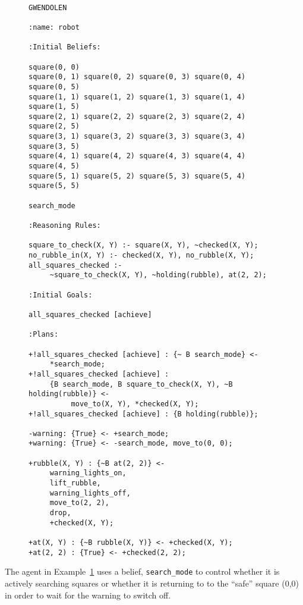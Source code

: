\begin{figure}[!htbp]
\begin{ourexample}
\label{code:pickuprubble_nolock} \quad \\
\begin{lstlisting}[basicstyle=\sffamily,style=easslisting,language=Gwendolen]
GWENDOLEN

:name: robot

:Initial Beliefs:

square(0, 0) 
square(0, 1) square(0, 2) square(0, 3) square(0, 4) square(0, 5)
square(1, 1) square(1, 2) square(1, 3) square(1, 4) square(1, 5)
square(2, 1) square(2, 2) square(2, 3) square(2, 4) square(2, 5)
square(3, 1) square(3, 2) square(3, 3) square(3, 4) square(3, 5)
square(4, 1) square(4, 2) square(4, 3) square(4, 4) square(4, 5)
square(5, 1) square(5, 2) square(5, 3) square(5, 4) square(5, 5)

search_mode

:Reasoning Rules:

square_to_check(X, Y) :- square(X, Y), ~checked(X, Y);
no_rubble_in(X, Y) :- checked(X, Y), no_rubble(X, Y);
all_squares_checked :- 
     ~square_to_check(X, Y), ~holding(rubble), at(2, 2);

:Initial Goals:

all_squares_checked [achieve]

:Plans:

+!all_squares_checked [achieve] : {~ B search_mode} <- 
     *search_mode;
+!all_squares_checked [achieve] : 
     {B search_mode, B square_to_check(X, Y), ~B holding(rubble)} <- 
          move_to(X, Y), *checked(X, Y);
+!all_squares_checked [achieve] : {B holding(rubble)};

-warning: {True} <- +search_mode;
+warning: {True} <- -search_mode, move_to(0, 0);

+rubble(X, Y) : {~B at(2, 2)} <- 
     warning_lights_on, 
     lift_rubble, 
     warning_lights_off, 
     move_to(2, 2), 
     drop, 
     +checked(X, Y);

+at(X, Y) : {~B rubble(X, Y)} <- +checked(X, Y);
+at(2, 2) : {True} <- +checked(2, 2);
\end{lstlisting}
\end{ourexample}
\end{figure}
The agent in Example~\ref{code:pickuprubble_nolock} uses a belief,
\lstinline{search_mode} to control whether it is actively searching
squares or whether it is returning to to the ``safe'' square (0,0) in
order to wait for the warning to switch off.   


